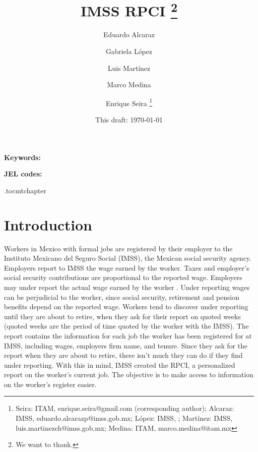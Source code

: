 \documentclass[oneside,11pt]{article}
\begin{document}
\title{IMSS RPCI \thanks{We want to thank.}}
\author{Eduardo Alcaraz \and Gabriela López \and Luis Martínez \and Marco Medina \and Enrique Seira  \thanks{Seira: ITAM, enrique.seira@gmail.com (corresponding author); Alcaraz: IMSS, eduardo.alcarazp@imss.gob.mx; López: IMSS, ; Martínez: IMSS, luis.martinezch@imss.gob.mx; Medina:  ITAM, marco.medina@itam.mx}}
\date{This draft:  \today \\[2 cm]}



\maketitle
\thispagestyle{empty}
\begin{abstract}


\end{abstract}

\vspace{.3in}

\textbf{Keywords: }

\textbf{JEL codes:}

\newpage

\etocdepthtag.toc{mtchapter}



\section{Introduction}
Workers in Mexico with formal jobs are registered by their employer to the Instituto Mexicano del Seguro Social (IMSS), the
Mexican social security agency. Employers report to IMSS the wage earned by the worker. Taxes and employer's social security contributions are proportional to the reported wage. Employers may under report the actual wage earned by the worker \citep{kumler2020enlisting}. Under reporting wages can be perjudicial to the worker, since social security, retirement and pension benefits depend on the reported wage. Workers tend to discover under reporting until they are about to retire, when they ask for their report on quoted weeks (quoted weeks are the period of time quoted by the worker with the IMSS). The report contains the information for each job the worker has been registered for at IMSS, including wages, employers firm name, and tenure. Since they ask for the report when they are about to retire, there isn't much they can do if they find under reporting. With this in mind, IMSS created the RPCI, a personalized report on the worker's current job. The objective is to make access to information on the worker's register easier.
\end{document}
